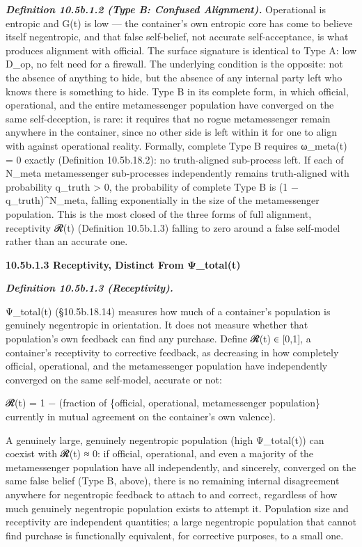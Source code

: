 \documentclass[
]{article}
\begin{document}
\emph{\textbf{Definition 10.5b.1.2 (Type B: Confused Alignment).}}
Operational is entropic and G(t) is low --- the container's own entropic
core has come to believe itself negentropic, and that false self-belief,
not accurate self-acceptance, is what produces alignment with official.
The surface signature is identical to Type A: low D\_op, no felt need
for a firewall. The underlying condition is the opposite: not the
absence of anything to hide, but the absence of any internal party left
who knows there is something to hide. Type B in its complete form, in
which official, operational, and the entire metamessenger population
have converged on the same self-deception, is rare: it requires that no
rogue metamessenger remain anywhere in the container, since no other
side is left within it for one to align with against operational
reality. Formally, complete Type B requires ω\_meta(t) = 0 exactly
(Definition 10.5b.18.2): no truth-aligned sub-process left. If each of
N\_meta metamessenger sub-processes independently remains truth-aligned
with probability q\_truth \textgreater{} 0, the probability of complete
Type B is (1 − q\_truth)\^{}N\_meta, falling exponentially in the size of
the metamessenger population. This is the most closed of the three
forms of full alignment, receptivity 𝓡(t) (Definition 10.5b.1.3)
falling to zero around a false self-model rather than an accurate
one.

\textbf{10.5b.1.3 Receptivity, Distinct From Ψ\_total(t)}

\emph{\textbf{Definition 10.5b.1.3 (Receptivity).}}

Ψ\_total(t) (§10.5b.18.14) measures how much of a container's population
is genuinely negentropic in orientation. It does not measure whether
that population's own feedback can find any purchase. Define 𝓡(t) ∈
{[}0,1{]}, a container's receptivity to corrective feedback, as
decreasing in how completely official, operational, and the
metamessenger population have independently converged on the same
self-model, accurate or not:

𝓡(t) = 1 − (fraction of \{official, operational, metamessenger
population\} currently in mutual agreement on the container's own
valence).

A genuinely large, genuinely negentropic population (high Ψ\_total(t))
can coexist with 𝓡(t) ≈ 0: if official, operational, and even a majority
of the metamessenger population have all independently, and sincerely,
converged on the same false belief (Type B, above), there is no
remaining internal disagreement anywhere for negentropic feedback to
attach to and correct, regardless of how much genuinely negentropic
population exists to attempt it. Population size and receptivity are
independent quantities; a large negentropic population that cannot find
purchase is functionally equivalent, for corrective purposes, to a small
one.
\end{document}

